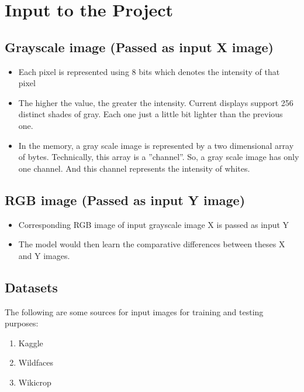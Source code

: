 \documentclass[12pt]{report}	%
\begin{document}
\section{Input to the Project}
\subsection{Grayscale image (Passed as input X image)} 
\begin{itemize}

\item
Each pixel is represented using 8 bits which denotes the intensity of that pixel

\item
The higher the value, the greater the intensity. Current displays support 256 distinct shades of gray. Each one just a little bit lighter than the previous one.

\item
In the memory, a gray scale image is represented by a two dimensional array of bytes. Technically, this array is a ”channel”. So, a gray scale image has only one channel. And this channel represents the intensity of whites.

\end{itemize}

\subsection{RGB image (Passed as input Y image)} 
\begin{itemize}
\item
Corresponding RGB image of input grayscale image X is passed as input Y
\item
The model would then learn the comparative differences between theses X and Y images.

\end{itemize}

\subsection{Datasets}
The following are some sources for input images for training and testing purposes:
\begin{enumerate}
\item Kaggle
\item Wildfaces
\item Wikicrop
\end{enumerate}
\\
\end{document}
